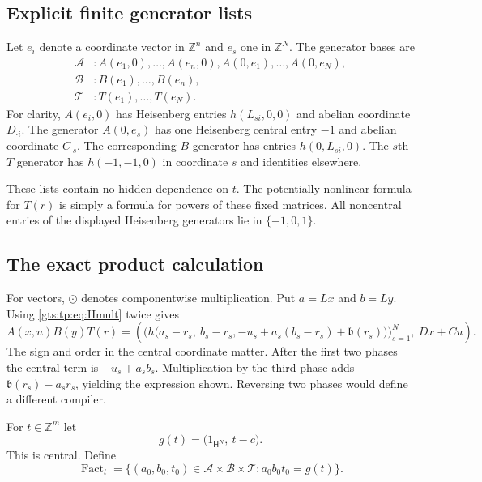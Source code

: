 \documentclass[11pt,letterpaper]{article}
\theoremstyle{definition}
\theoremstyle{remark}
\newcommand{\ZZ}{\mathbb Z}
\newcommand{\HH}{\mathsf H}
\newcommand{\calA}{\mathcal A}
\newcommand{\calB}{\mathcal B}
\newcommand{\calT}{\mathcal T}
\newcommand{\bn}{\mathfrak b}
\DeclareMathOperator{\Fact}{Fact}
\begin{document}
\subsection{Explicit finite generator lists}
Let $e_i$ denote a coordinate vector in $\ZZ^n$ and $e_s$ one in $\ZZ^N$.
The generator bases are
\begin{equation}\label{gts:tp:eq:bases}
\begin{split}
 \calA &: A(e_1,0),\ldots,A(e_n,0),
          A(0,e_1),\ldots,A(0,e_N),\\
 \calB &: B(e_1),\ldots,B(e_n),\\
 \calT &: T(e_1),\ldots,T(e_N).
\end{split}
\end{equation}
For clarity, $A(e_i,0)$ has Heisenberg entries $h(L_{si},0,0)$ and abelian
coordinate $D_{\cdot i}$. The generator $A(0,e_s)$ has one Heisenberg central
entry $-1$ and abelian coordinate $C_{\cdot s}$. The corresponding $B$
generator has entries $h(0,L_{si},0)$. The $s$th $T$ generator has
$h(-1,-1,0)$ in coordinate $s$ and identities elsewhere.

These lists contain no hidden dependence on $t$. The potentially nonlinear
formula for $T(r)$ is simply a formula for powers of these fixed matrices.
All noncentral entries of the displayed Heisenberg generators lie in
$\{-1,0,1\}$.

\subsection{The exact product calculation}
For vectors, $\odot$ denotes componentwise multiplication. Put $a=Lx$ and
$b=Ly$. Using \eqref{gts:tp:eq:Hmult} twice gives
\begin{equation}\label{gts:tp:eq:master}
 A(x,u)B(y)T(r)=
 \left(\Big(h\big(a_s-r_s,\ b_s-r_s,
       -u_s+a_s(b_s-r_s)+\bn(r_s)\big)\Big)_{s=1}^N,
       \ Dx+Cu\right).
\end{equation}
The sign and order in the central coordinate matter. After the first two
phases the central term is $-u_s+a_sb_s$. Multiplication by the third
phase adds $\bn(r_s)-a_sr_s$, yielding the expression shown. Reversing two
phases would define a different compiler.

For $t\in\ZZ^m$ let
\begin{equation}\label{gts:tp:eq:target}
                 g(t)=\big(1_{\HH^N},\ t-c\big).
\end{equation}
This is central. Define
\[
 \Fact_t=\{(a_0,b_0,t_0)\in\calA\times\calB\times\calT:
                         a_0b_0t_0=g(t)\}.
\]
\end{document}
